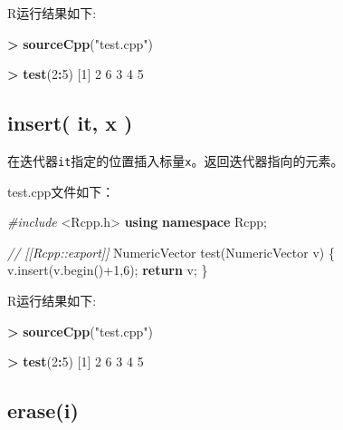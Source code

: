 \documentclass[]{ctexbook}
\newenvironment{Shaded}{\begin{snugshade}}{\end{snugshade}}
\newcommand{\KeywordTok}[1]{\textcolor[rgb]{0.13,0.29,0.53}{\textbf{#1}}}
\newcommand{\DecValTok}[1]{\textcolor[rgb]{0.00,0.00,0.81}{#1}}
\newcommand{\StringTok}[1]{\textcolor[rgb]{0.31,0.60,0.02}{#1}}
\newcommand{\ImportTok}[1]{#1}
\newcommand{\CommentTok}[1]{\textcolor[rgb]{0.56,0.35,0.01}{\textit{#1}}}
\newcommand{\ControlFlowTok}[1]{\textcolor[rgb]{0.13,0.29,0.53}{\textbf{#1}}}
\newcommand{\OperatorTok}[1]{\textcolor[rgb]{0.81,0.36,0.00}{\textbf{#1}}}
\newcommand{\PreprocessorTok}[1]{\textcolor[rgb]{0.56,0.35,0.01}{\textit{#1}}}
\newcommand{\NormalTok}[1]{#1}
\begin{document}
R运行结果如下:

\begin{Shaded}
\begin{Highlighting}[]
\OperatorTok{>}\StringTok{ }\KeywordTok{sourceCpp}\NormalTok{(}\StringTok{"test.cpp"}\NormalTok{)}

\OperatorTok{>}\StringTok{ }\KeywordTok{test}\NormalTok{(}\DecValTok{2}\OperatorTok{:}\DecValTok{5}\NormalTok{)}
\NormalTok{[}\DecValTok{1}\NormalTok{] }\DecValTok{2} \DecValTok{6} \DecValTok{3} \DecValTok{4} \DecValTok{5}
\end{Highlighting}
\end{Shaded}

\subsection{insert( it, x )}\label{insertit}

在迭代器\texttt{it}指定的位置插入标量\texttt{x}。返回迭代器指向的元素。

test.cpp文件如下：

\begin{Shaded}
\begin{Highlighting}[]
\PreprocessorTok{#include }\ImportTok{<Rcpp.h>}
\KeywordTok{using} \KeywordTok{namespace}\NormalTok{ Rcpp;}

\CommentTok{// [[Rcpp::export]]}
\NormalTok{NumericVector test(NumericVector v) \{}
\NormalTok{  v.insert(v.begin()}\DecValTok{+1}\NormalTok{,}\DecValTok{6}\NormalTok{);}
  \ControlFlowTok{return}\NormalTok{ v;}
\NormalTok{\}}
\end{Highlighting}
\end{Shaded}

R运行结果如下:

\begin{Shaded}
\begin{Highlighting}[]
\OperatorTok{>}\StringTok{ }\KeywordTok{sourceCpp}\NormalTok{(}\StringTok{"test.cpp"}\NormalTok{)}

\OperatorTok{>}\StringTok{ }\KeywordTok{test}\NormalTok{(}\DecValTok{2}\OperatorTok{:}\DecValTok{5}\NormalTok{)}
\NormalTok{[}\DecValTok{1}\NormalTok{] }\DecValTok{2} \DecValTok{6} \DecValTok{3} \DecValTok{4} \DecValTok{5}
\end{Highlighting}
\end{Shaded}

\subsection{erase(i)}\label{vector-erasei}
\end{document}
